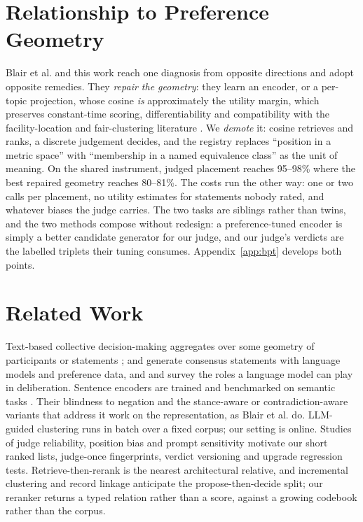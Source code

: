 \documentclass{article}
\newcommand{\bpt}{Blair et al.\xspace}
\begin{document}


\section{Relationship to Preference Geometry}
\label{sec:bpt}
\bpt and this work reach one diagnosis from opposite directions and adopt opposite remedies. They \emph{repair the geometry}: they learn an encoder, or a per-topic projection, whose cosine \emph{is} approximately the utility margin, which preserves constant-time scoring, differentiability and compatibility with the facility-location and fair-clustering literature \citep{chen2019proportionally,micha2020proportionally}. We \emph{demote} it: cosine retrieves and ranks, a discrete judgement decides, and the registry replaces ``position in a metric space'' with ``membership in a named equivalence class'' as the unit of meaning. On the shared instrument, judged placement reaches 95--98\% where the best repaired geometry reaches 80--81\%. The costs run the other way: one or two calls per placement, no utility estimates for statements nobody rated, and whatever biases the judge carries. The two tasks are siblings rather than twins, and the two methods compose without redesign: a preference-tuned encoder is simply a better candidate generator for our judge, and our judge's verdicts are the labelled triplets their tuning consumes. Appendix~\ref{app:bpt} develops both points.

\section{Related Work}
Text-based collective decision-making aggregates over some geometry of participants or statements \citep{small2021polis,fish2026generative,chooi2026common,de2026question}; \citet{tessler2024ai} and \citet{bakker2022finetuning} generate consensus statements with language models and preference data, and \citet{small2023opportunities} and \citet{konya2023democratic} survey the roles a language model can play in deliberation. Sentence encoders are trained and benchmarked on semantic tasks \citep{reimers2019sentence,ni2022sentencet5,muennighoff2023mteb}. Their blindness to negation \citep{vahtola2022easy} and the stance-aware or contradiction-aware variants that address it \citep{ghafouri2024pineapple,xu2024sparsecl,gao2021simcse} work on the representation, as \bpt do. LLM-guided clustering \citep{viswanathan2024large,zhang2023clusterllm,pham2024topicgpt,wan2024tntllm} runs in batch over a fixed corpus; our setting is online. Studies of judge reliability, position bias and prompt sensitivity \citep{zheng2023judging,wang2023large,liu2024lost,sclar2024quantifying,atil2024llm,chen2023chatgpt} motivate our short ranked lists, judge-once fingerprints, verdict versioning and upgrade regression tests. Retrieve-then-rerank \citep{nogueira2019passage,lewis2020retrieval} is the nearest architectural relative, and incremental clustering \citep{charikar2004incremental} and record linkage \citep{fellegi1969theory} anticipate the propose-then-decide split; our reranker returns a typed relation rather than a score, against a growing codebook rather than the corpus.
\end{document}
